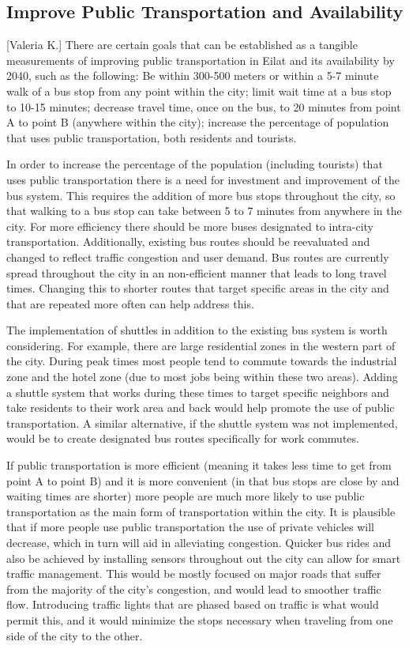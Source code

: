 \documentclass[12pt]{article}                               %
\begin{document}
\subsection{Improve Public Transportation and Availability}[Valeria K.] \label{sec:disc_improve_transport}
There are certain goals that can be established as a tangible measurements of improving public transportation in Eilat and its availability by 2040, such as the following: Be within 300-500 meters or within a 5-7 minute walk of a bus stop from any point within the city; limit wait time at a bus stop to 10-15 minutes; decrease travel time, once on the bus, to 20 minutes from point A to point B (anywhere within the city); increase the percentage of population that uses public transportation, both residents and tourists.

In order to increase the percentage of the population (including tourists) that uses public transportation there is a need for investment and improvement of the bus system. This requires the addition of more bus stops throughout the city, so that walking to a bus stop can take between 5 to 7 minutes from anywhere in the city. For more efficiency there should be more buses designated to intra-city transportation. Additionally, existing bus routes should be reevaluated and changed to reflect traffic congestion and user demand. Bus routes are currently spread throughout the city in an non-efficient manner that leads to long travel times. Changing this to shorter routes that target specific areas in the city and that are repeated more often can help address this.

The implementation of shuttles in addition to the existing bus system is worth considering. For example, there are large residential zones in the western part of the city. During peak times most people tend to commute towards the industrial zone and the hotel zone (due to most jobs being within these two areas). Adding a shuttle system that works during these times to target specific neighbors and take residents to their work area and back would help promote the use of public transportation. A similar alternative, if the shuttle system was not implemented, would be to create designated bus routes specifically for work commutes.
    
If public transportation is more efficient (meaning it takes less time to get from point A to point B) and it is more convenient (in that bus stops are close by and waiting times are shorter) more people are much more likely to use public transportation as the main form of transportation within the city. It is plausible that if more people use public transportation the use of private vehicles will decrease, which in turn will aid in alleviating congestion. Quicker bus rides and also be achieved by installing sensors throughout out the city can allow for smart traffic management. This would be mostly focused on major roads that suffer from the majority of the city's congestion, and would lead to smoother traffic flow. Introducing traffic lights that are phased based on traffic is what would permit this, and it would minimize the stops necessary when traveling from one side of the city to the other.
\end{document}
